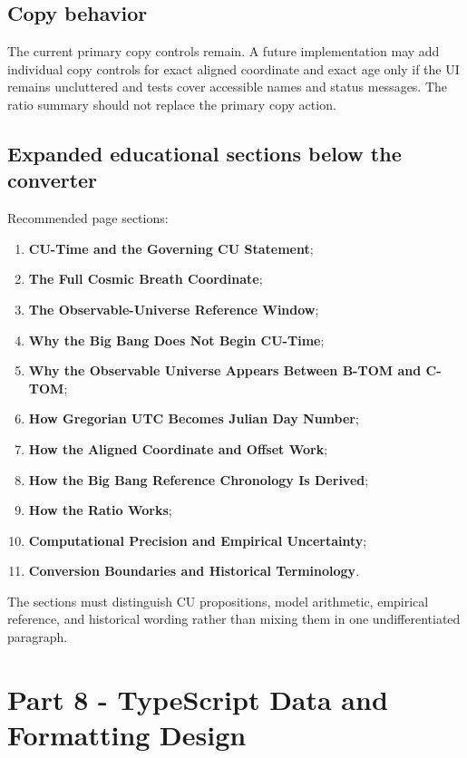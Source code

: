 \documentclass[11pt,letterpaper]{article}
\newcommand{\term}[1]{\textbf{\textsf{#1}}}
\begin{document}
\subsection{Copy behavior}

The current primary copy controls remain. A future implementation may add
individual copy controls for exact aligned coordinate and exact age only if the
UI remains uncluttered and tests cover accessible names and status messages.
The ratio summary should not replace the primary copy action.

\subsection{Expanded educational sections below the converter}

Recommended page sections:

\begin{enumerate}
    \item \term{CU-Time and the Governing CU Statement};
    \item \term{The Full Cosmic Breath Coordinate};
    \item \term{The Observable-Universe Reference Window};
    \item \term{Why the Big Bang Does Not Begin CU-Time};
    \item \term{Why the Observable Universe Appears Between B-TOM and C-TOM};
    \item \term{How Gregorian UTC Becomes Julian Day Number};
    \item \term{How the Aligned Coordinate and Offset Work};
    \item \term{How the Big Bang Reference Chronology Is Derived};
    \item \term{How the Ratio Works};
    \item \term{Computational Precision and Empirical Uncertainty};
    \item \term{Conversion Boundaries and Historical Terminology}.
\end{enumerate}

The sections must distinguish CU propositions, model arithmetic, empirical
reference, and historical wording rather than mixing them in one undifferentiated
paragraph.

\section{Part 8 - TypeScript Data and Formatting Design}
\end{document}
